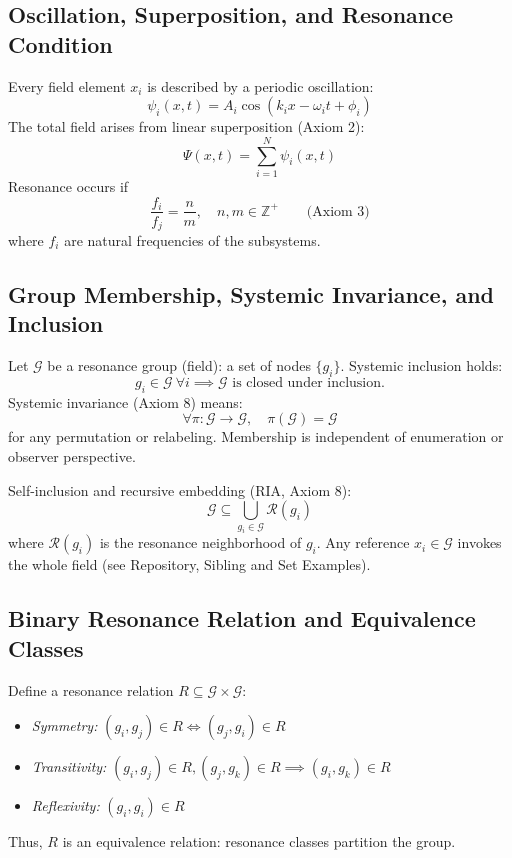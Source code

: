 \documentclass[12pt]{article}
\begin{document}
	\subsection{Oscillation, Superposition, and Resonance Condition}
	
	Every field element $x_i$ is described by a periodic oscillation:
	\[
	\psi_i(x, t) = A_i \cos(k_i x - \omega_i t + \phi_i)
	\]
	The total field arises from linear superposition (Axiom 2):
	\[
	\Psi(x, t) = \sum_{i=1}^N \psi_i(x, t)
	\]
	Resonance occurs if
	\[
	\frac{f_i}{f_j} = \frac{n}{m}, \quad n, m \in \mathbb{Z}^+ \qquad \text{(Axiom 3)}
	\]
	where $f_i$ are natural frequencies of the subsystems.
	
	\subsection{Group Membership, Systemic Invariance, and Inclusion}
	
	Let $\mathcal{G}$ be a resonance group (field): a set of nodes $\{g_i\}$. Systemic inclusion holds:
	\[
	g_i \in \mathcal{G}\ \forall i \implies \mathcal{G} \text{ is closed under inclusion.}
	\]
	Systemic invariance (Axiom 8) means:
	\[
	\forall \pi : \mathcal{G} \to \mathcal{G},\quad \pi(\mathcal{G}) = \mathcal{G}
	\]
	for any permutation or relabeling. Membership is independent of enumeration or observer perspective.
	
	Self-inclusion and recursive embedding (RIA, Axiom 8):
	\[
	\mathcal{G} \subseteq \bigcup_{g_i \in \mathcal{G}} \mathcal{R}(g_i)
	\]
	where $\mathcal{R}(g_i)$ is the resonance neighborhood of $g_i$. Any reference $x_i \in \mathcal{G}$ invokes the whole field (see Repository, Sibling and Set Examples).
	
	\subsection{Binary Resonance Relation and Equivalence Classes}
	
	Define a resonance relation $R \subseteq \mathcal{G} \times \mathcal{G}$:
	\begin{itemize}
		\item \textit{Symmetry:} $(g_i, g_j) \in R \iff (g_j, g_i) \in R$
		\item \textit{Transitivity:} $(g_i, g_j) \in R, (g_j, g_k) \in R \implies (g_i, g_k) \in R$
		\item \textit{Reflexivity:} $(g_i, g_i) \in R$
	\end{itemize}
	Thus, $R$ is an equivalence relation: resonance classes partition the group.
	
\end{document}
